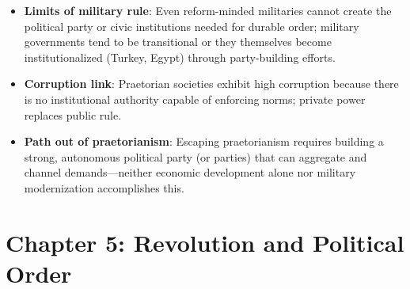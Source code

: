 \documentclass[12pt]{article}
\begin{document}
\begin{itemize}[leftmargin=*, itemsep=4pt]
    \item \textbf{Limits of military rule}: Even reform-minded militaries cannot create the political party or civic institutions needed for durable order; military governments tend to be transitional or they themselves become institutionalized (Turkey, Egypt) through party-building efforts.
    \item \textbf{Corruption link}: Praetorian societies exhibit high corruption because there is no institutional authority capable of enforcing norms; private power replaces public rule.
    \item \textbf{Path out of praetorianism}: Escaping praetorianism requires building a strong, autonomous political party (or parties) that can aggregate and channel demands---neither economic development alone nor military modernization accomplishes this.
\end{itemize}

\section{Chapter 5: Revolution and Political Order}
\end{document}
